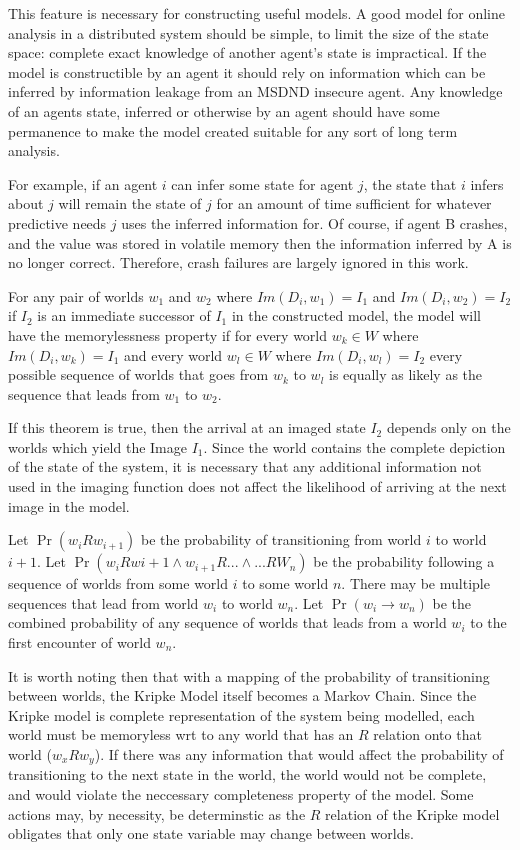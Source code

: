 This feature is necessary for constructing useful models. A good model for online analysis in a distributed system should be simple, to limit the size of the state space: complete exact knowledge of another agent's state is impractical. If the model is constructible by an agent it should rely on information which can be inferred by information leakage from an MSDND insecure agent. Any knowledge of an agents state, inferred or otherwise by an agent should have some permanence to make the model created suitable for any sort of long term analysis. 

For example, if an agent $i$ can infer some state for agent $j$, the state that $i$ infers about $j$ will remain the state of $j$ for an amount of time sufficient for whatever predictive needs $j$ uses the inferred information for. Of course, if agent B crashes, and the value was stored in volatile memory then the information inferred by A is no longer correct. Therefore, crash failures are largely ignored in this work.

\begin{thm}
For any pair of worlds $w_1$ and $w_2$ where $Im(D_i, w_1)=I_1$ and $Im(D_i, w_2)=I_2$ if $I_2$ is an immediate successor of $I_1$ in the constructed model, the model will have the memorylessness property if for every world $w_k \in W$ where $Im(D_i, w_k)=I_1$ and every world $w_l \in W$ where $Im(D_i, w_l)=I_2$ every possible sequence of worlds that goes from $w_k$ to $w_l$ is equally as likely as the sequence that leads from $w_1$ to $w_2$. 
\end{thm}

If this theorem is true, then the arrival at an imaged state $I_2$ depends only on the worlds which yield the Image $I_1$. Since the world contains the complete depiction of the state of the system, it is necessary that any additional information not used in the imaging function does not affect the likelihood of arriving at the next image in the model.

Let $\Pr(w_{i}Rw_{i+1})$ be the probability of transitioning from world $i$ to world $i+1$. Let $\Pr(w_{i}Rw{i+1} \wedge w_{i+1}R... \wedge ...RW_{n})$ be the probability following a sequence of worlds from some world $i$ to some world $n$. There may be multiple sequences that lead from world $w_i$ to world $w_n$. Let $\Pr(w_i \rightarrow w_n)$ be the combined probability of any sequence of worlds that leads from a world $w_i$ to the first encounter of world $w_n$.

It is worth noting then that with a mapping of the probability of transitioning between worlds, the Kripke Model itself becomes a Markov Chain.
Since the Kripke model is complete representation of the system being modelled, each world must be memoryless wrt to any world that has an $R$ relation onto that world ($w_xRw_y$).
If there was any information that would affect the probability of transitioning to the next state in the world, the world would not be complete, and would violate the neccessary completeness property of the model.
Some actions may, by necessity, be determinstic as the $R$ relation of the Kripke model obligates that only one state variable may change between worlds.

